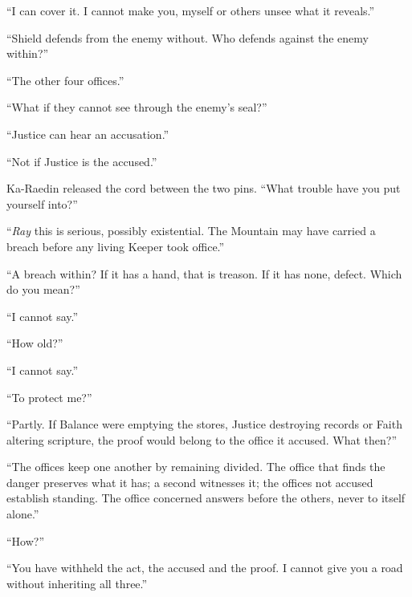 ``I can cover it. I cannot make you, myself or others unsee what it reveals.''\par

``Shield defends from the enemy without. Who defends against the enemy within?''\par

``The other four offices.''\par

``What if they cannot see through the enemy's seal?''\par

``Justice can hear an accusation.''\par

``Not if Justice is the accused.''\par

Ka-Raedin released the cord between the two pins. ``What trouble have you put yourself into?''\par

``\textit{Ray} this is serious, possibly existential. The Mountain may have carried a breach before any living Keeper took office.''\par

``A breach within? If it has a hand, that is treason. If it has none, defect. Which do you mean?''\par

``I cannot say.''\par

``How old?''\par

``I cannot say.''\par

``To protect me?''\par

``Partly. If Balance were emptying the stores, Justice destroying records or Faith altering scripture, the proof would belong to the office it accused. What then?''\par

``The offices keep one another by remaining divided. The office that finds the danger preserves what it has; a second witnesses it; the offices not accused establish standing. The office concerned answers before the others, never to itself alone.''\par

``How?''\par

``You have withheld the act, the accused and the proof. I cannot give you a road without inheriting all three.''\par

